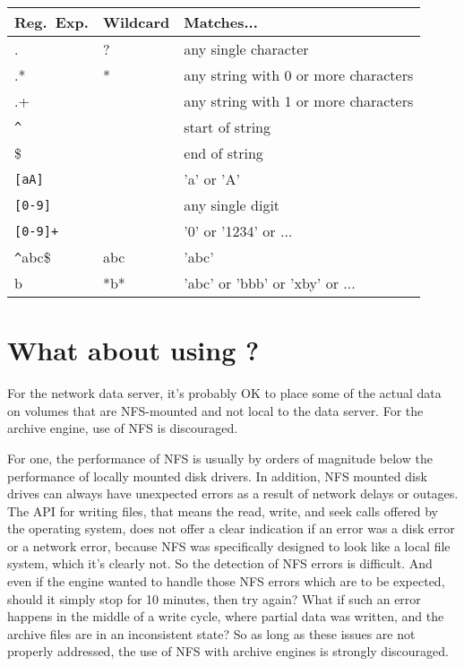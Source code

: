 \begin{center}
\begin{tabular}{l|l|l}
Reg.\ Exp.    &   Wildcard  &   Matches...  \\
\hline 
.             &   ?         &   any single character \\
.*            &   *         &   any string with 0 or more characters \\
.+            &             &   any string with 1 or more characters \\
\verb!^!      &             &   start of string \\
\$            &             &   end of string \\
\verb![aA]!   &             &   'a' or 'A' \\
\verb![0-9]!  &             &   any single digit \\
\verb![0-9]+! &             &   '0' or '1234' or ... \\
\verb!^!abc\$ &   abc       &   'abc' \\
b             &   *b*       &   'abc' or 'bbb' or 'xby' or ... \\
\end{tabular}
\end{center}

\section{What about using ?}
For the network data server, it's probably OK to place some of the actual data
on volumes that are NFS-mounted and not local to the data server.
For the archive engine, use of NFS is discouraged.

For one, the performance of NFS is usually by orders of magnitude below
the performance of locally mounted disk drivers.
In addition, NFS mounted disk drives can always have unexpected errors
as a result of network delays or outages.
The API for writing files, that means the read, write, and seek calls offered
by the operating system, does not offer a clear indication if an error
was a disk error or a network error, because NFS was specifically designed
to look like a local file system, which it's clearly not.
So the detection of NFS errors is difficult. And even if the engine wanted
to handle those NFS errors which are to be expected, should it simply stop
for 10 minutes, then try again? What if such an error happens in the middle
of a write cycle, where partial data was written, and the archive files are
in an inconsistent state?
So as long as these issues are not properly addressed, the use of NFS with
archive engines is strongly discouraged.


